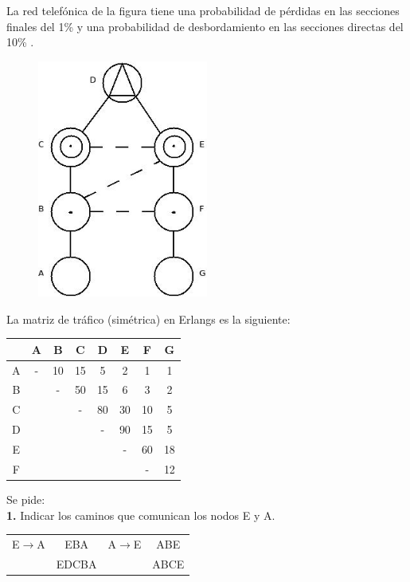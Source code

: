\begin{exercise}[5]
La red telefónica de la figura tiene una probabilidad de pérdidas en las secciones finales del 1\% y una probabilidad de desbordamiento en las secciones directas del 10\% .
\begin{figure}[H]
\centering
\includegraphics[width=0.5\textwidth]{Imagen/ejercicio5tema1.jpg}
\label{}
\end{figure}
La matriz de tráfico (simétrica) en Erlangs es la siguiente:
\begin{center}
\begin{tabular}{| c | c | c | c | c | c | c | c |}
\hline
   & A & B & C & D & E & F & G \\\hline
 A & - & 10 & 15 & 5 & 2 & 1 & 1 \\\hline
 B &   & - & 50 & 15 & 6 & 3 & 2 \\\hline
 C &   &   & - & 80 & 30 & 10 & 5 \\\hline
 D &   &   &   & - & 90 & 15 & 5 \\\hline
 E &   &   &   &   & - & 60 & 18 \\\hline
 F &   &   &   &   &   & - & 12 \\\hline
\end{tabular}
\end{center}
Se pide:\\
\textbf{1.} Indicar los caminos que comunican los nodos E y A.\\
\begin{center}
\begin{tabular}{c c c c}
E$\to$A & EBA  		& A$\to$E 	& ABE 	\\
 		& EDCBA		&			& ABCE	\\

\end{tabular}
\end{center}
\end{exercise}
